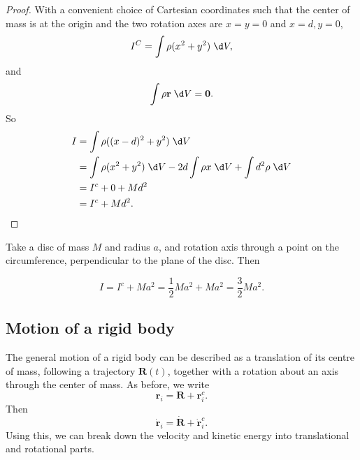 \documentclass[a4paper]{article}
\begin{document}
\begin{proof}
  With a convenient choice of Cartesian coordinates such that the center of mass is at the origin and the two rotation axes are $x = y =0$ and $x = d, y = 0$,
  \[
    I^C = \int \rho (x^2 + y^2) \;\d V,
  \]
  and
  \[
    \int \rho \mathbf{r}\;\d V = \mathbf{0}.
  \]
  So
  \begin{align*}
    I &= \int \rho((x - d)^2 + y^2)\;\d V\\
    &=\int \rho (x^2 + y^2)\;\d V - 2d\int \rho x\;\d V + \int d^2 \rho\;\d V\\
    &= I^c + 0 + Md^2\\
    &= I^c + Md^2.\qedhere
  \end{align*}
\end{proof}

\begin{eg}
  Take a disc of mass $M$ and radius $a$, and rotation axis through a point on the circumference, perpendicular to the plane of the disc. Then
  \begin{center}
  \end{center}
  \[
    I = I^c + Ma^2 = \frac{1}{2}Ma^2 + Ma^2 = \frac{3}{2}Ma^2.
  \]
\end{eg}

\subsection{Motion of a rigid body}
The general motion of a rigid body can be described as a translation of its centre of mass, following a trajectory $\mathbf{R}(t)$, together with a rotation about an axis through the center of mass. As before, we write
\[
  \mathbf{r}_i = \mathbf{R} + \mathbf{r}_i^c.
\]
Then
\[
  \dot{\mathbf{r}}_i = \dot{\mathbf{R}} + \dot{\mathbf{r}}_i^c.
\]
Using this, we can break down the velocity and kinetic energy into translational and rotational parts.
\end{document}
